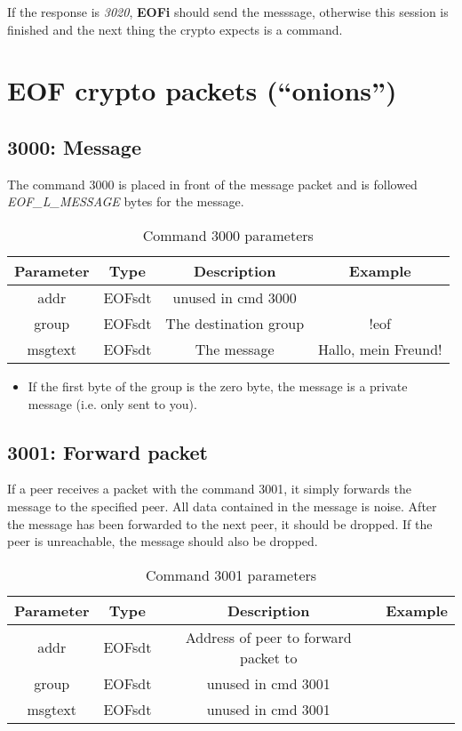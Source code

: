 \documentclass[12pt,a4paper]{book}
\begin{document}
{If the response is \textit{3020}, \textbf{EOFi} should send the messsage,
otherwise this session is finished and the next thing the crypto expects
is a command.
\section{EOF crypto packets ("`onions"')}
\subsection{3000: Message}
The command 3000 is placed in front of the message packet and is
followed \emph{EOF\_L\_MESSAGE} bytes for the message.
%
\begin{longtable}{|c|c|c|c|}
\caption{Command 3000 parameters}\\
\hline
\textbf{Parameter} & \textbf{Type} & \textbf{Description} & \textbf{Example}\\
\hline
addr & EOFsdt & unused in cmd 3000 &\\
\hline
group & EOFsdt & The destination group & !eof\\
\hline
msgtext & EOFsdt & The message & Hallo, mein Freund!\\
\hline
\end{longtable}
\begin{itemize}
\item If the first byte of the group is the zero byte, the message
is a private message (i.e. only sent to you).
\end{itemize}
\subsection{3001: Forward packet}
If a peer receives a packet with the command 3001, it simply forwards
the message to the specified peer. All data contained in the message
is noise. After the message has been forwarded to the next peer, it
should be dropped. If the peer is unreachable, the message should also
be dropped.
%
\begin{longtable}{|c|c|c|c|}
\caption{Command 3001 parameters}\\
\hline
\textbf{Parameter} & \textbf{Type} & \textbf{Description} & \textbf{Example}\\
\hline
addr & EOFsdt & Address of peer to forward packet to&\\
\hline
group & EOFsdt & unused in cmd 3001\\
\hline
msgtext & EOFsdt & unused in cmd 3001\\
\hline
\end{longtable}
}
\end{document}
